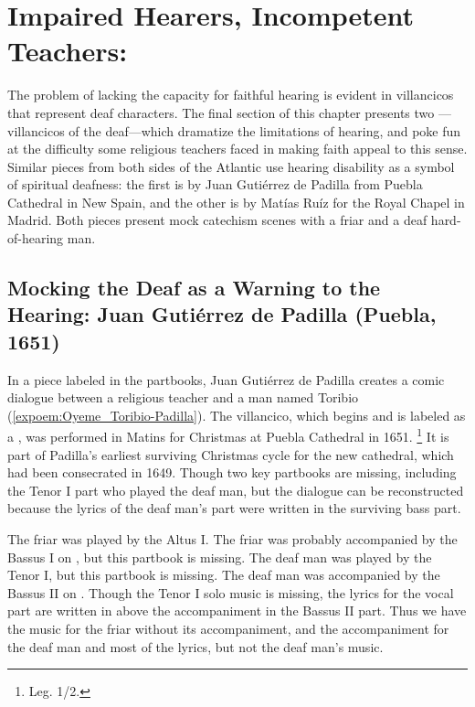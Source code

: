 \section{Impaired Hearers, Incompetent Teachers: }

The problem of lacking the capacity for faithful hearing is evident in
villancicos that represent deaf characters.
The final section of this chapter presents two ---villancicos of the deaf---which dramatize the limitations of hearing, and poke fun at the difficulty some religious teachers faced in making faith appeal to this sense.
Similar pieces from both sides of the Atlantic use hearing disability as a symbol of spiritual deafness: the first is by Juan Gutiérrez de Padilla from Puebla Cathedral in New Spain, and the other is by Matías Ruíz for the Royal Chapel in Madrid.
Both pieces present mock catechism scenes with a friar and a deaf hard-of-hearing man.

\subsection{Mocking the Deaf as a Warning to the Hearing: Juan Gutiérrez de Padilla (Puebla, 1651)}

In a piece labeled  in the partbooks, Juan Gutiérrez de Padilla creates a comic dialogue between a religious teacher and a  man named Toribio (\ref{expoem:Oyeme_Toribio-Padilla}).
The villancico, which begins  and is labeled as a , was performed in Matins for Christmas at Puebla Cathedral in 1651.%
\footnote{\signature{MEX-Pc}{Leg. 1/2}.}
It is part of Padilla's earliest surviving Christmas cycle for the new cathedral, which had been consecrated in 1649.
Though two key partbooks are missing, including the Tenor I part who played the deaf man, but the dialogue can be reconstructed because the lyrics of the deaf man's part were written in the surviving bass part.%
\begin{Footnote}
  The friar was played by the Altus I. 
  The friar was probably accompanied by the Bassus I on , but this partbook is missing.
  The deaf man was played by the Tenor I, but this partbook is missing.
  The deaf man was accompanied by the Bassus II on .
  Though the Tenor I solo music is missing, the lyrics for the vocal part are written in above the accompaniment in the Bassus II part. 
  Thus we have the music for the friar without its accompaniment, and the accompaniment for the deaf man and most of the lyrics, but not the deaf man's music.
\end{Footnote}

